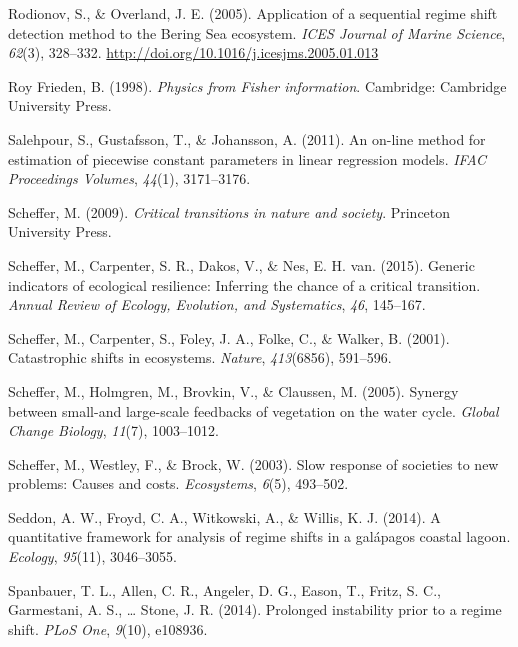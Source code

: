 \documentclass[12pt,twoside,openany]{reedthesis}
\begin{document}
\hypertarget{ref-rodionov_application_2005}{}
Rodionov, S., \& Overland, J. E. (2005). Application of a sequential
regime shift detection method to the Bering Sea ecosystem. \emph{ICES
Journal of Marine Science}, \emph{62}(3), 328--332.
\url{http://doi.org/10.1016/j.icesjms.2005.01.013}

\hypertarget{ref-roy_frieden_physics_1998}{}
Roy Frieden, B. (1998). \emph{Physics from Fisher information}.
Cambridge: Cambridge University Press.

\hypertarget{ref-salehpour2011line}{}
Salehpour, S., Gustafsson, T., \& Johansson, A. (2011). An on-line
method for estimation of piecewise constant parameters in linear
regression models. \emph{IFAC Proceedings Volumes}, \emph{44}(1),
3171--3176.

\hypertarget{ref-scheffer_critical_2009}{}
Scheffer, M. (2009). \emph{Critical transitions in nature and society}.
Princeton University Press.

\hypertarget{ref-scheffer2015generic}{}
Scheffer, M., Carpenter, S. R., Dakos, V., \& Nes, E. H. van. (2015).
Generic indicators of ecological resilience: Inferring the chance of a
critical transition. \emph{Annual Review of Ecology, Evolution, and
Systematics}, \emph{46}, 145--167.

\hypertarget{ref-scheffer_catastrophic_2001}{}
Scheffer, M., Carpenter, S., Foley, J. A., Folke, C., \& Walker, B.
(2001). Catastrophic shifts in ecosystems. \emph{Nature},
\emph{413}(6856), 591--596.

\hypertarget{ref-scheffer2005synergy}{}
Scheffer, M., Holmgren, M., Brovkin, V., \& Claussen, M. (2005). Synergy
between small-and large-scale feedbacks of vegetation on the water
cycle. \emph{Global Change Biology}, \emph{11}(7), 1003--1012.

\hypertarget{ref-scheffer2003slow}{}
Scheffer, M., Westley, F., \& Brock, W. (2003). Slow response of
societies to new problems: Causes and costs. \emph{Ecosystems},
\emph{6}(5), 493--502.

\hypertarget{ref-seddon2014quantitative}{}
Seddon, A. W., Froyd, C. A., Witkowski, A., \& Willis, K. J. (2014). A
quantitative framework for analysis of regime shifts in a galápagos
coastal lagoon. \emph{Ecology}, \emph{95}(11), 3046--3055.

\hypertarget{ref-spanbauer_prolonged_2014}{}
Spanbauer, T. L., Allen, C. R., Angeler, D. G., Eason, T., Fritz, S. C.,
Garmestani, A. S., \ldots{} Stone, J. R. (2014). Prolonged instability
prior to a regime shift. \emph{PLoS One}, \emph{9}(10), e108936.
\end{document}
